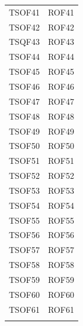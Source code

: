 \documentclass[../PianoDiQualifica_v4.0.0.tex]{subfiles}
\begin{document}
\begin{longtable}[c] { >{\centering\arraybackslash}p{3cm} >{\centering\arraybackslash}p{3cm}}
			\addlinespace[0.3em]
			\midrule
			\addlinespace[0.3em]
			TSOF41 & ROF41 \\
			\addlinespace[0.3em]
			\midrule
			\addlinespace[0.3em]
			TSOF42 & ROF42 \\
			\addlinespace[0.3em]
			\midrule
			\addlinespace[0.3em]
			TSQF43 & ROF43 \\
			\addlinespace[0.3em]
			\midrule
			\addlinespace[0.3em]
			TSOF44 & ROF44 \\
			\addlinespace[0.3em]
			\midrule
			\addlinespace[0.3em]
			TSOF45 & ROF45 \\
			\addlinespace[0.3em]
			\midrule
			\addlinespace[0.3em]
			TSOF46 & ROF46 \\
			\addlinespace[0.3em]
			\midrule
			\addlinespace[0.3em]
			TSOF47 & ROF47 \\
			\addlinespace[0.3em]
			\midrule
			\addlinespace[0.3em]
			TSOF48 & ROF48 \\
			\addlinespace[0.3em]
			\midrule
			\addlinespace[0.3em]
			TSOF49 & ROF49 \\
			\addlinespace[0.3em]
			\midrule
			\addlinespace[0.3em]
			TSOF50 & ROF50 \\
			\addlinespace[0.3em]
			\midrule
			\addlinespace[0.3em]
			TSOF51 & ROF51 \\
			\addlinespace[0.3em]
			\midrule
			\addlinespace[0.3em]
			TSOF52 & ROF52 \\
			\addlinespace[0.3em]
			\midrule
			\addlinespace[0.3em]
			TSOF53 & ROF53 \\
			\addlinespace[0.3em]
			\midrule
			\addlinespace[0.3em]
			TSOF54 & ROF54 \\
			\addlinespace[0.3em]
			\midrule
			\addlinespace[0.3em]
			TSOF55 & ROF55 \\
			\addlinespace[0.3em]
			\midrule
			\addlinespace[0.3em]
			TSOF56 & ROF56 \\
			\addlinespace[0.3em]
			\midrule
			\addlinespace[0.3em]
			TSOF57 & ROF57 \\
			\addlinespace[0.3em]
			\midrule
			\addlinespace[0.3em]
			TSOF58 & ROF58 \\
			\addlinespace[0.3em]
			\midrule
			\addlinespace[0.3em]
			TSOF59 & ROF59 \\
			\addlinespace[0.3em]
			\midrule
			\addlinespace[0.3em]
			TSOF60 & ROF60 \\
			\addlinespace[0.3em]
			\midrule
			\addlinespace[0.3em]
			TSOF61 & ROF61 \\
			\addlinespace[0.3em]
			\midrule
			\addlinespace[0.3em]

\end{longtable}
\end{document}
